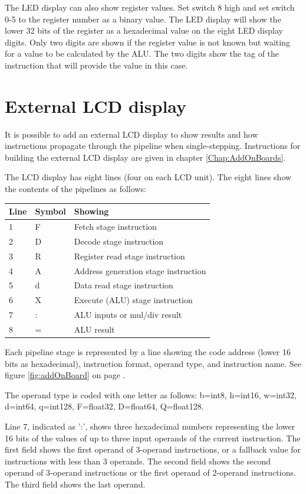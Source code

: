 \documentclass[11pt,a4paper,oneside,openright]{report}
\newcommand{\vv}{ \vspace{2mm} }   %
\begin{document}
The LED display can also show register values. Set switch 8 high and set switch 0-5 to the register number as a binary value. The LED display will show the lower 32 bits of the register as a hexadecimal value on the eight LED display digits. 
Only two digits are shown if the register value is not known but waiting for a value to be calculated by the ALU. The two digits show the tag of the instruction that will provide the value in this case.
\vv

\section{External LCD display}
It is possible to add an external LCD display to show results and how instructions propagate through the pipeline when single-stepping. Instructions for building the external LCD display are given in chapter \ref{Chap:AddOnBoards}.
\vv

The LCD display has eight lines (four on each LCD unit). The eight lines show the contents of the pipelines as follows:
\vv

\begin{tabular}{|l|l|l|} 
\hline
\bfseries Line & \bfseries Symbol & \bfseries Showing  \\ \hline
1  & F & Fetch stage instruction \\ \hline
2  & D & Decode stage instruction \\ \hline
3  & R & Register read stage instruction \\ \hline
4  & A & Address generation stage instruction \\ \hline
5  & d & Data read stage instruction \\ \hline
6  & X & Execute (ALU) stage instruction \\ \hline
7  & : & ALU inputs or mul/div result \\ \hline
8  & = & ALU result \\ \hline
\end{tabular}
\vv

Each pipeline stage is represented by a line showing the code address (lower 16 bits as hexadecimal), instruction format, operand type, and instruction name. See figure \ref{fig:addOnBoard} on page \pageref{fig:addOnBoard}. 
\vv

The operand type is coded with one letter as follows: b=int8, h=int16, w=int32, d=int64, q=int128, F=float32, D=float64, Q=float128.
\vv

Line 7, indicated as ':', shows three hexadecimal numbers representing the lower 16 bits of the values of up to three input operands of the current instruction. The first field shows the first operand of 3-operand instructions, or a fallback value for instructions with less than 3 operands. The second field shows the second operand of 3-operand instructions or the first operand of 2-operand instructions. The third field shows the last operand.
\vv
\end{document}
